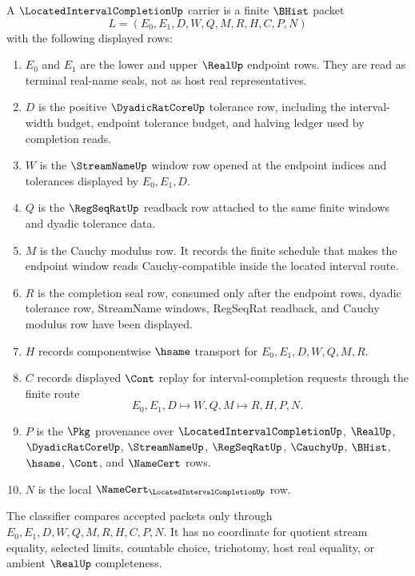 \begin{definition}
\label{def:located-interval-completion-carrier}
A $\LocatedIntervalCompletionUp$ carrier is a finite $\BHist$ packet
$$
L=(E_0,E_1,D,W,Q,M,R,H,C,P,N)
$$
with the following displayed rows:
\begin{enumerate}
\item $E_0$ and $E_1$ are the lower and upper $\RealUp$ endpoint rows. They are read as terminal real-name seals, not as host real representatives.
\item $D$ is the positive $\DyadicRatCoreUp$ tolerance row, including the interval-width budget, endpoint tolerance budget, and halving ledger used by completion reads.
\item $W$ is the $\StreamNameUp$ window row opened at the endpoint indices and tolerances displayed by $E_0,E_1,D$.
\item $Q$ is the $\RegSeqRatUp$ readback row attached to the same finite windows and dyadic tolerance data.
\item $M$ is the Cauchy modulus row. It records the finite schedule that makes the endpoint window reads Cauchy-compatible inside the located interval route.
\item $R$ is the completion seal row, consumed only after the endpoint rows, dyadic tolerance row, StreamName windows, RegSeqRat readback, and Cauchy modulus row have been displayed.
\item $H$ records componentwise $\hsame$ transport for $E_0,E_1,D,W,Q,M,R$.
\item $C$ records displayed $\Cont$ replay for interval-completion requests through the finite route
$$
E_0,E_1,D \longmapsto W,Q,M \longmapsto R,H,P,N .
$$
\item $P$ is the $\Pkg$ provenance over $\LocatedIntervalCompletionUp$, $\RealUp$, $\DyadicRatCoreUp$, $\StreamNameUp$, $\RegSeqRatUp$, $\CauchyUp$, $\BHist$, $\hsame$, $\Cont$, and $\NameCert$ rows.
\item $N$ is the local $\NameCert_{\LocatedIntervalCompletionUp}$ row.
\end{enumerate}
The classifier compares accepted packets only through $E_0,E_1,D,W,Q,M,R,H,C,P,N$. It has no coordinate for quotient stream equality, selected limits, countable choice, trichotomy, host real equality, or ambient $\RealUp$ completeness.
\end{definition}

